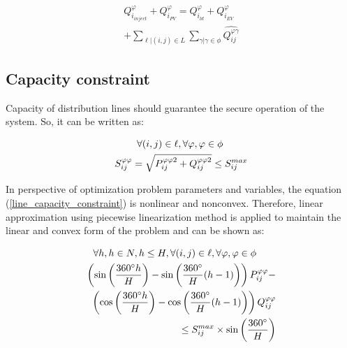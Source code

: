 \documentclass[journal]{IEEEtran}
\begin{document}
\begin{equation}\label{replaced_Q_ij_phigamma}
\begin{split}
Q_{i_{inject}} ^{\varphi} + Q _{i_{PV}} ^{\varphi} =  Q _{i_{ld}} ^{\varphi} +  Q _{i_{EV}} ^{\varphi} \\ +\displaystyle\sum_{\ell|(i,j)\in L}\displaystyle\sum_{\gamma|\gamma\in\phi}\hat{Q_{ij}^{\varphi\gamma}}
\end{split}
\end{equation}

\subsection {Capacity constraint}

Capacity of distribution lines should guarantee the secure operation of the system. So, it can be written as:

\begin{equation}\label{line_capacity_constraint}
\begin{split}
\forall (i,j) \in \ell, \forall \varphi,\varphi \in \phi \hskip 25pt \\ S _{ij}^{\varphi\varphi}= \sqrt{P _{ij}^{\varphi\varphi2}+Q _{ij}^{\varphi\varphi2}} \leq S _{ij}^{max}
\end{split}
\end{equation}

In perspective of optimization problem parameters and variables, the equation (\ref{line_capacity_constraint}) is nonlinear and nonconvex. Therefore, linear approximation using piecewise linearization method \cite{akbari2016linear} is applied to maintain the linear and convex form of the problem and can be shown as:

\begin{center}
\begin{equation}\label{linearized_line_capacity_constraint}
\begin{split}
\forall h, h\in N, h\leq H, \forall(i,j) \in \ell, \forall\varphi,\varphi \in \phi \hskip 20pt \\
\left(\sin\left(\frac{360^{\circ}h}{H}\right)-\sin\left(\frac{360^{\circ}}{H}(h-1)\right)\right) P_{ij} ^{\varphi \varphi}-\\
\left(\cos\left(\frac{360^{\circ}h}{H}\right)-\cos\left(\frac{360^{\circ}}{H}(h-1)\right)\right) Q_{ij} ^{\varphi \varphi} \\ \leq S_{ij}^{max} \times \sin\left(\frac{360^{\circ}}{H}\right)
\end{split}
\end{equation}
\end{center}
\end{document}
